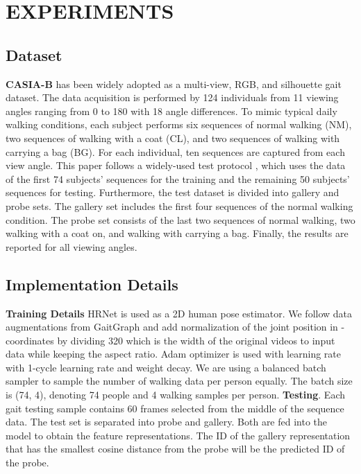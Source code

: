 \documentclass{article}
\begin{document}
\section{EXPERIMENTS}
\subsection{Dataset}
\textbf{CASIA-B} \cite{CASIA-B} has been widely adopted as a multi-view, RGB, and silhouette gait dataset. The data acquisition is performed by 124 individuals from 11 viewing angles ranging from 0 to 180 with 18 angle differences. To mimic typical daily walking conditions, each subject performs six sequences of normal walking (NM), two sequences of walking with a coat (CL), and two sequences of walking with carrying a bag (BG). For each individual, ten sequences are captured from each view angle. This paper follows a widely-used test protocol \cite{GaitNet}\cite{GaitSet}\cite{GaitPart}\cite{GaitGraph}\cite{GaitGraph2}\cite{PoseGait}, which uses the data of the first 74 subjects' sequences for the training and the remaining 50 subjects' sequences for testing. Furthermore, the test dataset is divided into gallery and probe sets. The gallery set includes the first four sequences of the normal walking condition. The probe set consists of the last two sequences of normal walking, two walking with a coat on, and walking with carrying a bag. Finally, the results are reported for all viewing angles. 

\subsection{Implementation Details}



\noindent\textbf{Training Details} HRNet \cite{hrnet} is used as a 2D human pose estimator. We follow data augmentations from GaitGraph\cite{GaitGraph} and add normalization of the joint position in -coordinates by dividing 320 which is the width of the original videos to  input data while keeping the aspect ratio. Adam optimizer is used with  learning rate with 1-cycle learning rate and  weight decay. We are using a balanced batch sampler to sample the number of walking data per person equally. The batch size is (74, 4), denoting 74 people and 4 walking samples per person. \noindent\textbf{Testing}. 
Each gait testing sample contains 60 frames selected from the middle of the sequence data. The test set is separated into probe and gallery.  Both are fed into the model to obtain the feature representations. The ID of the gallery representation that has the smallest cosine distance from the probe will be the predicted ID of the probe. 
\end{document}
